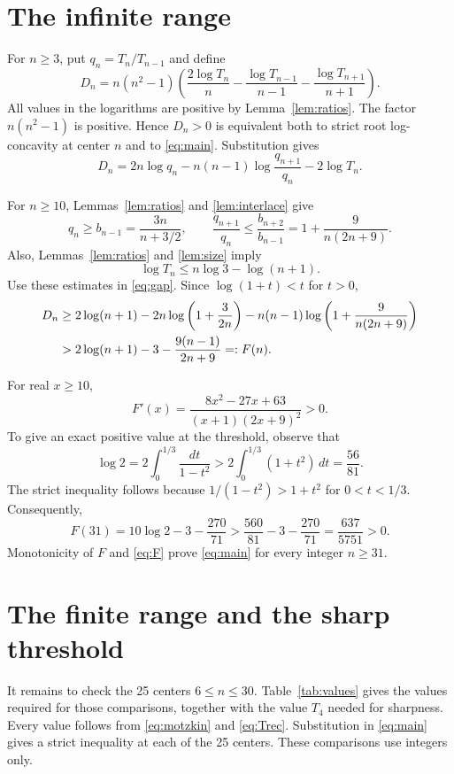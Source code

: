 \documentclass[11pt]{article}
\begin{document}
\section{The infinite range}

For $n\ge3$, put $q_n=T_n/T_{n-1}$ and define
\[
D_n=n(n^2-1)
\left(\frac{2\log T_n}{n}
-\frac{\log T_{n-1}}{n-1}
-\frac{\log T_{n+1}}{n+1}\right).
\]
All values in the logarithms are positive by Lemma~\ref{lem:ratios}.
The factor $n(n^2-1)$ is positive. Hence $D_n>0$ is equivalent both to
strict root log-concavity at center $n$ and to \eqref{eq:main}.
Substitution gives
\begin{equation}\label{eq:gap}
D_n=2n\log q_n
-n(n-1)\log\frac{q_{n+1}}{q_n}-2\log T_n.
\end{equation}

For $n\ge10$, Lemmas~\ref{lem:ratios} and \ref{lem:interlace} give
\[
q_n\ge b_{n-1}=\frac{3n}{n+3/2},\qquad
\frac{q_{n+1}}{q_n}
\le\frac{b_{n+2}}{b_{n-1}}
=1+\frac9{n(2n+9)}.
\]
Also, Lemmas~\ref{lem:ratios} and \ref{lem:size} imply
\[
\log T_n\le n\log3-\log(n+1).
\]
Use these estimates in \eqref{eq:gap}. Since $\log(1+t)<t$ for $t>0$,
\begin{align}
D_n
&\ge 2\log(n+1)
-2n\log\left(1+\frac3{2n}\right)
-n(n-1)\log\left(1+\frac9{n(2n+9)}\right)\notag\\
&>2\log(n+1)-3-\frac{9(n-1)}{2n+9}
=:F(n).\label{eq:F}
\end{align}

For real $x\ge10$,
\[
F'(x)=\frac{8x^2-27x+63}{(x+1)(2x+9)^2}>0.
\]
To give an exact positive value at the threshold, observe that
\[
\log2=2\int_0^{1/3}\frac{dt}{1-t^2}
>2\int_0^{1/3}(1+t^2)\,dt
=\frac{56}{81}.
\]
The strict inequality follows because
$1/(1-t^2)>1+t^2$ for $0<t<1/3$.
Consequently,
\[
F(31)=10\log2-3-\frac{270}{71}
>\frac{560}{81}-3-\frac{270}{71}
=\frac{637}{5751}>0.
\]
Monotonicity of $F$ and \eqref{eq:F} prove \eqref{eq:main} for every
integer $n\ge31$.

\section{The finite range and the sharp threshold}

It remains to check the 25 centers $6\le n\le30$.
Table~\ref{tab:values} gives the values required for those comparisons,
together with the value $T_4$ needed for sharpness.
Every value follows from \eqref{eq:motzkin} and \eqref{eq:Trec}.
Substitution in \eqref{eq:main} gives a strict inequality at each of the
25 centers. These comparisons use integers only.
\end{document}
